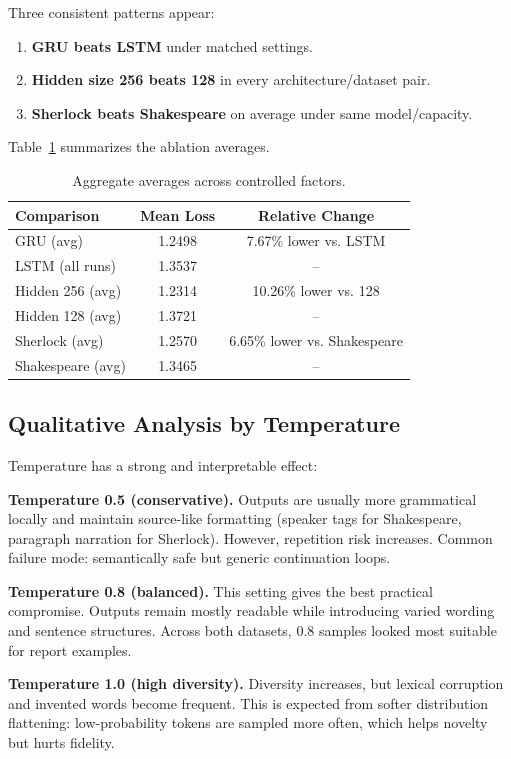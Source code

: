\documentclass[10pt,twocolumn,letterpaper]{article}
\begin{document}
Three consistent patterns appear:
\begin{enumerate}
\item \textbf{GRU beats LSTM} under matched settings.
\item \textbf{Hidden size 256 beats 128} in every architecture/dataset pair.
\item \textbf{Sherlock beats Shakespeare} on average under same model/capacity.
\end{enumerate}

Table~\ref{tab:aggregate} summarizes the ablation averages.

\begin{table}[t]
\centering
\caption{Aggregate averages across controlled factors.}
\label{tab:aggregate}
\small
\begin{tabular}{lcc}
\toprule
Comparison & Mean Loss & Relative Change \\
\midrule
GRU (avg) & 1.2498 & 7.67\% lower vs. LSTM \\
LSTM (all runs) & 1.3537 & -- \\
Hidden 256 (avg) & 1.2314 & 10.26\% lower vs. 128 \\
Hidden 128 (avg) & 1.3721 & -- \\
Sherlock (avg) & 1.2570 & 6.65\% lower vs. Shakespeare \\
Shakespeare (avg) & 1.3465 & -- \\
\bottomrule
\end{tabular}
\end{table}

\subsection{Qualitative Analysis by Temperature}
Temperature has a strong and interpretable effect:

\textbf{Temperature 0.5 (conservative).}
Outputs are usually more grammatical locally and maintain source-like formatting (speaker tags for Shakespeare, paragraph narration for Sherlock). However, repetition risk increases. Common failure mode: semantically safe but generic continuation loops.

\textbf{Temperature 0.8 (balanced).}
This setting gives the best practical compromise. Outputs remain mostly readable while introducing varied wording and sentence structures. Across both datasets, 0.8 samples looked most suitable for report examples.

\textbf{Temperature 1.0 (high diversity).}
Diversity increases, but lexical corruption and invented words become frequent. This is expected from softer distribution flattening: low-probability tokens are sampled more often, which helps novelty but hurts fidelity.
\end{document}
